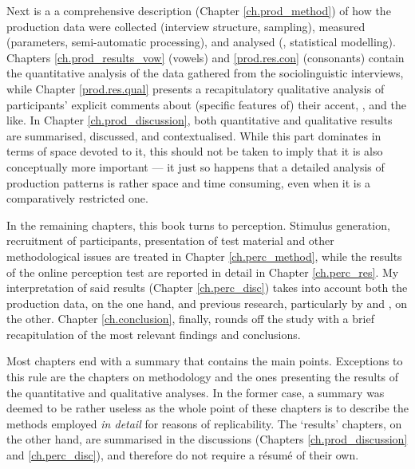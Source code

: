 Next is a a comprehensive description (Chapter \ref{ch.prod_method}) of how the production data were collected (interview structure, sampling), measured (parameters, semi-automatic processing), and analysed (, statistical modelling).
Chapters \ref{ch.prod_results_vow} (vowels) and \ref{prod.res.con} (consonants) contain the quantitative analysis of the data gathered from the sociolinguistic interviews, while Chapter \ref{prod.res.qual} presents a recapitulatory qualitative analysis of participants' explicit comments about (specific features of) their accent, , and the like.
In Chapter \ref{ch.prod_discussion}, both quantitative and qualitative results are summarised, discussed, and contextualised.
While this part dominates in terms of space devoted to it, this should not be taken to imply that it is also conceptually more important --- it just so happens that a detailed analysis of production patterns is rather space and time consuming, even when it is a comparatively restricted one.

In the remaining chapters, this book turns to perception.
Stimulus generation, recruitment of participants, presentation of test material and other methodological issues are treated in Chapter \ref{ch.perc_method}, while the results of the online perception test are reported in detail in Chapter \ref{ch.perc_res}.
My interpretation of said results (Chapter \ref{ch.perc_disc}) takes into account both the production data, on the one hand, and previous research, particularly by \citeauthor{hayetal2006a} and \citeauthor{haydrager2010}, on the other.
Chapter \ref{ch.conclusion}, finally, rounds off the study with a brief recapitulation of the most relevant findings and conclusions.

Most chapters end with a summary that contains the main points.
Exceptions to this rule are the chapters on methodology and the ones presenting the results of the quantitative and qualitative analyses.
In the former case, a summary was deemed to be rather useless as the whole point of these chapters is to describe the methods employed \emph{in detail} for reasons of replicability.
The `results' chapters, on the other hand, are summarised in the discussions (Chapters \ref{ch.prod_discussion} and \ref{ch.perc_disc}), and therefore do not require a résumé of their own.